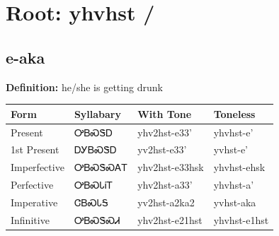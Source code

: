 \documentclass{article}%
\begin{document}
%
\normalsize%
\section*{Root: yhvhst / }%
\subsection*{e-aka}%
\textbf{Definition: }%
he/she is getting drunk%
\\[0.5em]%
\begin{tabular}{|l|l|l|l|}%
\hline%
\textbf{Form}&\textbf{Syllabary}&\textbf{With Tone}&\textbf{Toneless}\\%
\hline%
Present&ᎤᏴᏍᏕᎠ&yhv2hst{-}e33'&yhvhst{-}e'\\%
1st Present&ᎠᎩᏴᏍᏕᎠ&yv2hst{-}e33'&yvhst{-}e'\\%
Imperfective&ᎤᏴᏍᏕᏍᎪᎢ&yhv2hst{-}e33hsk&yhvhst{-}ehsk\\%
Perfective&ᎤᏴᏍᏓᎥᎢ&yhv2hst{-}a33'&yhvhst{-}a'\\%
Imperative&ᏣᏴᏍᏓᎦ&yv2hst{-}a2ka2&yvhst{-}aka\\%
Infinitive&ᎤᏴᏍᏕᏍᏗ&yhv2hst{-}e21hst&yhvhst{-}e1hst\\%
\hline%
\end{tabular}%
\\[1em]%
\end{document}

